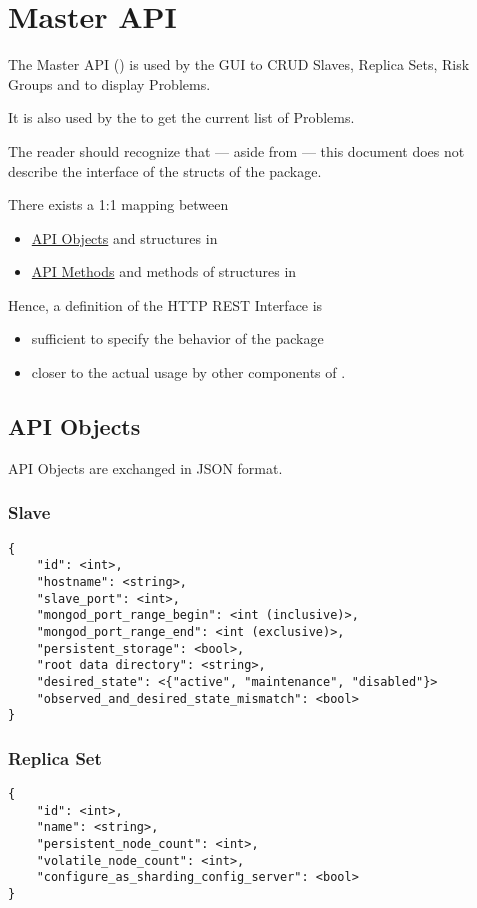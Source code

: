 \section{Master API}
The Master API () is used by the GUI to CRUD Slaves, Replica Sets, Risk Groups and to display Problems.

It is also used by the  to get the current list of Problems.

The reader should recognize that --- aside from  --- this document does not describe the interface
of the structs of the package.

There exists a 1:1 mapping between
\begin{itemize}
  \item \hyperref[masterapi:apiobjects]{API Objects} and structures in 
  \item \hyperref[masterapi:apimethods]{API Methods} and methods of structures in 
\end{itemize}

Hence, a definition of the HTTP REST Interface is
\begin{itemize}
  \item sufficient to specify the behavior of the  package
  \item closer to the actual usage by other components of \mamid.
\end{itemize}

\subsection{API Objects} \label{masterapi:apiobjects}
API Objects are exchanged in JSON format.
\subsubsection{Slave}
\begin{lstlisting}
{
	"id": <int>,
	"hostname": <string>,
	"slave_port": <int>,
	"mongod_port_range_begin": <int (inclusive)>,
	"mongod_port_range_end": <int (exclusive)>,
	"persistent_storage": <bool>,
	"root data directory": <string>,
	"desired_state": <{"active", "maintenance", "disabled"}>
	"observed_and_desired_state_mismatch": <bool>
}
\end{lstlisting}
\subsubsection{Replica Set}
\begin{lstlisting}
{
	"id": <int>,
	"name": <string>,
	"persistent_node_count": <int>,
	"volatile_node_count": <int>,
	"configure_as_sharding_config_server": <bool>
}
\end{lstlisting}
